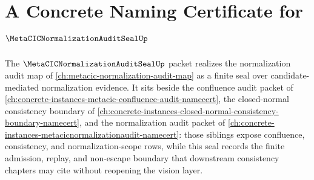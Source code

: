 \chapter{A Concrete Naming Certificate for $\MetaCICNormalizationAuditSealUp$}
\label{ch:concrete-instances-metacicnormalizationauditseal-namecert}

The $\MetaCICNormalizationAuditSealUp$ packet realizes the normalization audit map of \autoref{ch:metacic-normalization-audit-map} as a finite seal over candidate-mediated normalization evidence. It sits beside the confluence audit packet of \autoref{ch:concrete-instances-metacic-confluence-audit-namecert}, the closed-normal consistency boundary of \autoref{ch:concrete-instances-closed-normal-consistency-boundary-namecert}, and the normalization audit packet of \autoref{ch:concrete-instances-metacicnormalizationaudit-namecert}: those siblings expose confluence, consistency, and normalization-scope rows, while this seal records the finite admission, replay, and non-escape boundary that downstream consistency chapters may cite without reopening the vision layer.

